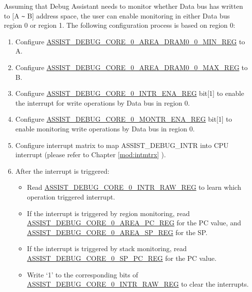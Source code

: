 \documentclass[main\_\_EN.tex]{subfiles}
\begin{document}
Assuming that Debug Assistant needs to monitor whether Data bus has written to [A \verb+~+ B] address space, the user can enable monitoring in either Data bus region 0 or region 1. The following configuration process is based on region 0:

\begin{enumerate}
    \item Configure \hyperref[regdesc:ASSISTDEBUGCORE0AREADRAM00MINREG]{ASSIST\_DEBUG\_CORE\_0\_AREA\_DRAM0\_0\_MIN\_REG} to A.
    \item Configure \hyperref[regdesc:ASSISTDEBUGCORE0AREADRAM00MAXREG]{ASSIST\_DEBUG\_CORE\_0\_AREA\_DRAM0\_0\_MAX\_REG} to B.
    \item Configure \hyperref[regdesc:ASSISTDEBUGCORE0INTRENAREG]{ASSIST\_DEBUG\_CORE\_0\_INTR\_ENA\_REG} bit[1] to enable the interrupt for write operations by Data bus in region 0.
    \item Configure \hyperref[regdesc:ASSISTDEBUGCORE0MONTRENAREG]{ASSIST\_DEBUG\_CORE\_0\_MONTR\_ENA\_REG} bit[1] to enable monitoring write operations by Data bus in region 0.
    \item Configure interrupt matrix to map ASSIST\_DEBUG\_INTR into CPU interrupt (please refer to Chapter \ref{mod:intmtrx} \textit{}).
    \item After the interrupt is triggered:
    
    \begin{itemize}
        \item Read \hyperref[regdesc:ASSISTDEBUGCORE0INTRRAWREG]{ASSIST\_DEBUG\_CORE\_0\_INTR\_RAW\_REG} to learn which operation triggered interrupt.
        
        \item If the interrupt is triggered by region monitoring, read \hyperref[regdesc:ASSISTDEBUGCORE0AREAPCREG]{ASSIST\_DEBUG\_CORE\_0\_AREA\_PC\_REG} for the PC value, and \hyperref[regdesc:ASSISTDEBUGCORE0AREASPREG]{ASSIST\_DEBUG\_CORE\_0\_AREA\_SP\_REG} for the SP.
        
        \item If the interrupt is triggered by stack monitoring, read \hyperref[regdesc:ASSISTDEBUGCORE0SPPCREG]{ASSIST\_DEBUG\_CORE\_0\_SP\_PC\_REG} for the PC value.
        
        \item Write `1' to the corresponding bits of \hyperref[regdesc:ASSISTDEBUGCORE0INTRRAWREG]{ASSIST\_DEBUG\_CORE\_0\_INTR\_RAW\_REG} to clear the interrupts.
    \end{itemize}

\end{enumerate}
\end{document}
